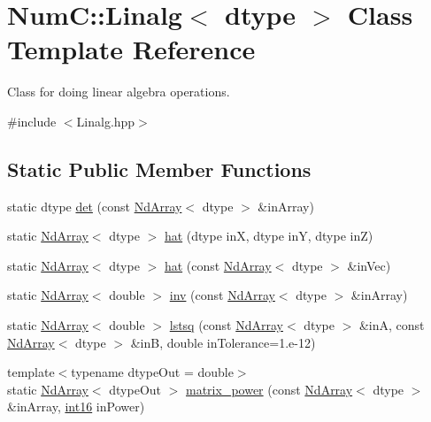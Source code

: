 \hypertarget{class_num_c_1_1_linalg}{}\section{NumC\+:\+:Linalg$<$ dtype $>$ Class Template Reference}
\label{class_num_c_1_1_linalg}


Class for doing linear algebra operations.  




{\ttfamily \#include $<$Linalg.\+hpp$>$}

\subsection*{Static Public Member Functions}
\begin{DoxyCompactItemize}
\item 
static dtype \mbox{\hyperlink{class_num_c_1_1_linalg_a72b53511efc570e3b030cbc6e549be91}{det}} (const \mbox{\hyperlink{class_num_c_1_1_nd_array}{Nd\+Array}}$<$ dtype $>$ \&in\+Array)
\item 
static \mbox{\hyperlink{class_num_c_1_1_nd_array}{Nd\+Array}}$<$ dtype $>$ \mbox{\hyperlink{class_num_c_1_1_linalg_a8819524018933c08f89f86ddda3f6779}{hat}} (dtype inX, dtype inY, dtype inZ)
\item 
static \mbox{\hyperlink{class_num_c_1_1_nd_array}{Nd\+Array}}$<$ dtype $>$ \mbox{\hyperlink{class_num_c_1_1_linalg_adb223dd51b52f44b942bcddd1717bba8}{hat}} (const \mbox{\hyperlink{class_num_c_1_1_nd_array}{Nd\+Array}}$<$ dtype $>$ \&in\+Vec)
\item 
static \mbox{\hyperlink{class_num_c_1_1_nd_array}{Nd\+Array}}$<$ double $>$ \mbox{\hyperlink{class_num_c_1_1_linalg_a8391fecf007442cc681631ad02d4c637}{inv}} (const \mbox{\hyperlink{class_num_c_1_1_nd_array}{Nd\+Array}}$<$ dtype $>$ \&in\+Array)
\item 
static \mbox{\hyperlink{class_num_c_1_1_nd_array}{Nd\+Array}}$<$ double $>$ \mbox{\hyperlink{class_num_c_1_1_linalg_a1fce87cb93eb80648efcbcb01ddb3ae7}{lstsq}} (const \mbox{\hyperlink{class_num_c_1_1_nd_array}{Nd\+Array}}$<$ dtype $>$ \&inA, const \mbox{\hyperlink{class_num_c_1_1_nd_array}{Nd\+Array}}$<$ dtype $>$ \&inB, double in\+Tolerance=1.e-\/12)
\item 
{\footnotesize template$<$typename dtype\+Out  = double$>$ }\\static \mbox{\hyperlink{class_num_c_1_1_nd_array}{Nd\+Array}}$<$ dtype\+Out $>$ \mbox{\hyperlink{class_num_c_1_1_linalg_afaf9148bc1f59c36a744e46472864a53}{matrix\+\_\+power}} (const \mbox{\hyperlink{class_num_c_1_1_nd_array}{Nd\+Array}}$<$ dtype $>$ \&in\+Array, \mbox{\hyperlink{namespace_num_c_a55b6140ac3972d03a7277fc227478dc2}{int16}} in\+Power)

\end{DoxyCompactItemize}
